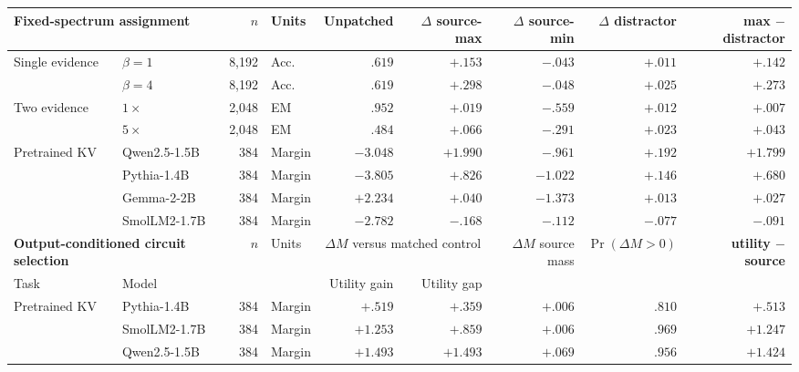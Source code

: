 \documentclass[letterpaper]{article} %
\newcommand{\helpful}[1]{\textcolor{pennblue}{\bfseries #1}}
\newcommand{\harmful}[1]{\textcolor{pennred}{\bfseries #1}}
\newcommand{\neutral}[1]{\textcolor{controlgray}{#1}}
\begin{document}
\begin{table}[!t]
\centering
\scriptsize
\setlength{\tabcolsep}{1.8pt}
\begin{tabular*}{\textwidth}{@{\extracolsep{\fill}}llrlrrrrr}
\toprule
\multicolumn{2}{l}{\textbf{Fixed-spectrum assignment}} & $n$ & Units & Unpatched & $\Delta$ source-max & $\Delta$ source-min & $\Delta$ distractor & \textbf{max $-$ distractor} \\
\midrule
Single evidence & $\beta=1$ & 8,192 & Acc. & $.619$ & \helpful{$+.153$} & \harmful{$-.043$} & \neutral{$+.011$} & \helpful{$+.142$} \\
 & $\beta=4$ & 8,192 & Acc. & $.619$ & \helpful{$+.298$} & \harmful{$-.048$} & \neutral{$+.025$} & \helpful{$+.273$} \\
\midrule
Two evidence & $1\times$ & 2,048 & EM & $.952$ & \helpful{$+.019$} & \harmful{$-.559$} & \neutral{$+.012$} & \helpful{$+.007$} \\
 & $5\times$ & 2,048 & EM & $.484$ & \helpful{$+.066$} & \harmful{$-.291$} & \neutral{$+.023$} & \helpful{$+.043$} \\
\midrule
Pretrained KV & Qwen2.5-1.5B & 384 & Margin & $-3.048$ & \helpful{$+1.990$} & \harmful{$-.961$} & \neutral{$+.192$} & \helpful{$+1.799$} \\
 & Pythia-1.4B & 384 & Margin & $-3.805$ & \helpful{$+.826$} & \harmful{$-1.022$} & \neutral{$+.146$} & \helpful{$+.680$} \\
 & Gemma-2-2B & 384 & Margin & $+2.234$ & \helpful{$+.040$} & \harmful{$-1.373$} & \neutral{$+.013$} & \helpful{$+.027$} \\
 & SmolLM2-1.7B & 384 & Margin & $-2.782$ & \harmful{$-.168$} & \harmful{$-.112$} & \neutral{$-.077$} & \harmful{$-.091$} \\
\midrule
\multicolumn{2}{l}{\textbf{Output-conditioned circuit selection}} & $n$ & Units & \multicolumn{2}{c}{$\Delta M$ versus matched control} & $\Delta M$ source mass & $\Pr(\Delta M>0)$ & \textbf{utility $-$ source} \\
\cmidrule(lr){5-6}
Task & Model & & & Utility gain & Utility gap & & & \\
\midrule
Pretrained KV & Pythia-1.4B & 384 & Margin & \helpful{$+.519$} & \helpful{$+.359$} & \neutral{$+.006$} & $.810$ & \helpful{$+.513$} \\
 & SmolLM2-1.7B & 384 & Margin & \helpful{$+1.253$} & \helpful{$+.859$} & \neutral{$+.006$} & $.969$ & \helpful{$+1.247$} \\
 & Qwen2.5-1.5B & 384 & Margin & \helpful{$+1.493$} & \helpful{$+1.493$} & \helpful{$+.069$} & $.956$ & \helpful{$+1.424$} \\

\end{tabular*}
\end{table}
\end{document}
